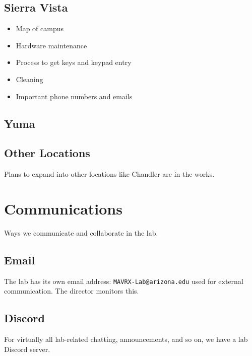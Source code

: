 \documentclass[
]{book}
\providecommand{\tightlist}{%
  \setlength{\itemsep}{0pt}\setlength{\parskip}{0pt}}
\begin{document}
\hypertarget{sierra-vista}{%
\section{Sierra Vista}\label{sierra-vista}}

\begin{itemize}
\tightlist
\item
  Map of campus
\item
  Hardware maintenance
\item
  Process to get keys and keypad entry
\item
  Cleaning
\item
  Important phone numbers and emails
\end{itemize}

\hypertarget{yuma}{%
\section{Yuma}\label{yuma}}

\hypertarget{other-locations}{%
\section{Other Locations}\label{other-locations}}

Plans to expand into other locations like Chandler are in the works.

\hypertarget{comms}{%
\chapter{Communications}\label{comms}}

Ways we communicate and collaborate in the lab.

\hypertarget{email}{%
\section{Email}\label{email}}

The lab has its own email address: \texttt{MAVRX-Lab@arizona.edu} used for external communication. The director monitors this.

\hypertarget{discord}{%
\section{Discord}\label{discord}}

For virtually all lab-related chatting, announcements, and so on, we have a lab Discord server.
\end{document}
